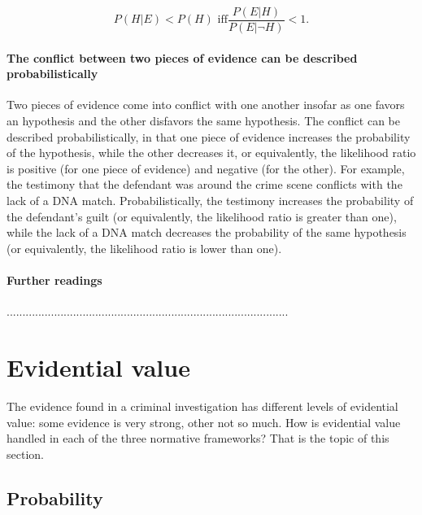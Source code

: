 \documentclass[10pt]{article}
\begin{document}
\[ P(H|E) < P(H) \text{ iff}  \frac{P(E|H)}{P(E|\neg H)} < 1.\]
%

\paragraph{The conflict between two pieces of evidence can be described probabilistically}
Two pieces of evidence come into 
conflict with one another insofar as one favors an hypothesis 
and the other disfavors the same hypothesis. 
The conflict can be described probabilistically, in that one piece of evidence increases 
the probability of the hypothesis, while the other decreases it, or equivalently, the likelihood ratio is positive (for one piece 
of evidence) and negative (for the other). 
For example, the testimony that the defendant was around the crime scene conflicts 
with the lack of a DNA match. Probabilistically, the testimony 
increases the probability of the defendant's guilt (or equivalently, the likelihood ratio is greater than one),
while the lack of a DNA match decreases the probability of the same hypothesis 
(or equivalently, the likelihood ratio is lower than one).

\paragraph{Further readings} 
.........................................................................................

\section{Evidential value}
\label{sec:str}

The evidence found in a criminal investigation has different levels of evidential value: some evidence is very strong, other not so much. How is evidential value handled in each of the three normative frameworks? That is the topic of this section.

\subsection{Probability}
\end{document}

